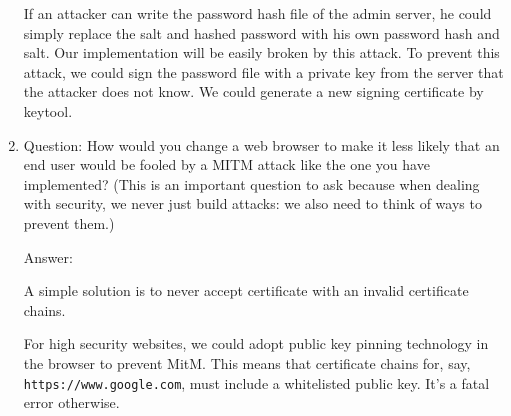 \begin{enumerate}[(1)]
If an attacker can write the password hash file of the admin server, he could simply replace the salt and hashed password with his own password hash and salt. Our implementation will be easily broken by this attack. To prevent this attack, we could sign the password file with a private key from the server that the attacker does not know. We could generate a new signing certificate by keytool. 

\item Question:
How would you change a web browser to make it less likely that an end user would be
fooled by a MITM attack like the one you have implemented? (This is an important
question to ask because when dealing with security, we never just build attacks: we
also need to think of ways to prevent them.)

Answer: 

A simple solution is to never accept certificate with an invalid certificate chains. 

For high security websites, we could adopt public key pinning technology in the browser to prevent MitM. This means that certificate chains for, say, \texttt{https://www.google.com}, must include a whitelisted public key. It's a fatal error otherwise. 


\end{enumerate}



